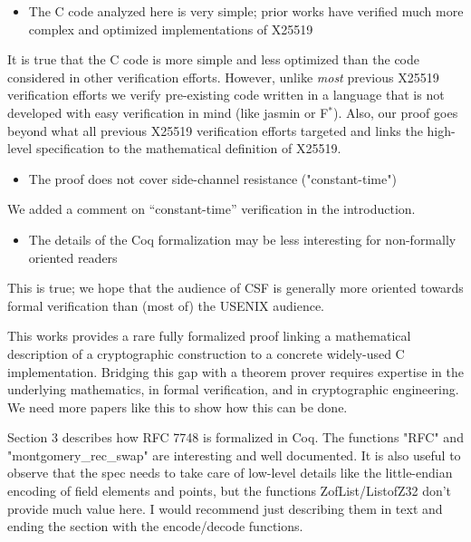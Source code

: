 \begin{center}
\end{center}

\begin{itemize}
  \item The C code analyzed here is very simple; prior works have verified much more complex and optimized implementations of X25519
\end{itemize}
\begin{answer}
  It is true that the C code is more simple and less optimized than the code considered in other verification efforts.
  However, unlike \emph{most} previous X25519 verification efforts we verify pre-existing code written in a language
  that is not developed with easy verification in mind (like jasmin or F$^*$).
  Also, our proof goes beyond what all previous X25519 verification efforts targeted and links the
  high-level specification to the mathematical definition of X25519.
\end{answer}
\begin{itemize}
  \item The proof does not cover side-channel resistance ("constant-time")
\end{itemize}
\begin{answer}
  We added a comment on ``constant-time'' verification in the introduction.
\end{answer}
\begin{itemize}
  \item The details of the Coq formalization may be less interesting for non-formally oriented readers
\end{itemize}
\begin{answer}
  This is true; we hope that the audience of CSF is generally more oriented towards formal verification
  than (most of) the USENIX audience.
\end{answer}

\begin{center}
\end{center}
This works provides a rare fully formalized proof linking a mathematical description of a cryptographic construction to a concrete widely-used C implementation. Bridging this gap with a theorem prover requires expertise in the underlying mathematics, in formal verification, and in cryptographic engineering. We need more papers like this to show how this can be done.

Section 3 describes how RFC 7748 is formalized in Coq. The functions "RFC" and "montgomery\_rec\_swap" are interesting and well documented. It is also useful to observe that the spec needs to take care of low-level details like the little-endian encoding of field elements and points, but the functions ZofList/ListofZ32 don't provide much value here. I would recommend just describing them in text and ending the section with the encode/decode functions.

